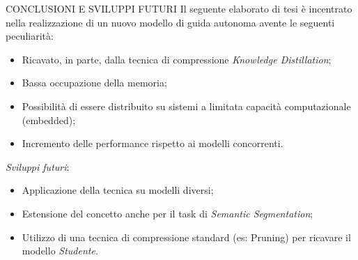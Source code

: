 \begin{frame}{CONCLUSIONI E SVILUPPI FUTURI}
    Il seguente elaborato di tesi è incentrato nella realizzazione di un nuovo modello di guida autonoma avente le seguenti peculiarità:
    \begin{itemize}
        \item Ricavato, in parte, dalla tecnica di compressione \emph{Knowledge Distillation};
        \item Bassa occupazione della memoria;
        \item Possibilità di essere distribuito su sistemi a limitata capacità computazionale (embedded);
        \item Incremento delle performance rispetto ai modelli concorrenti.
    \end{itemize}
    \vspace{0.5cm}
    \emph{Sviluppi futuri}:
    \begin{itemize}
        \item Applicazione della tecnica su modelli diversi;
        \item Estensione del concetto anche per il task di \emph{Semantic Segmentation};
        \item Utilizzo di una tecnica di compressione standard (es: Pruning) per ricavare il modello \emph{Studente}.
    \end{itemize}
\end{frame}